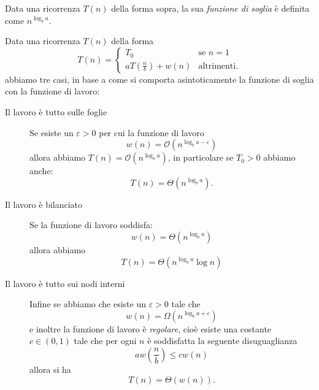\documentclass[11pt]{scrartcl}
\newcommand{\bigo}[1]{\mathcal{O}\!\left(#1\right)}
\newcommand{\bigomega}[1]{\Omega\!\left(#1\right)}
\newcommand{\bigtheta}[1]{\Theta\!\left(#1\right)}
\begin{document}
	\begin{definition}
		Data una ricorrenza $T(n)$ della forma sopra, la sua \textit{funzione di soglia} è definita come $n^{\log_b a}$.
	\end{definition}
	\begin{theorem}
		Data una ricorrenza $T(n)$ della forma
		$$T(n)=
		\begin{cases}
			T_0 & \text{se $n=1$} \\
			a T\left(\frac{n}{b}\right)+w(n) & \text{altrimenti.}
		\end{cases}
		$$
		abbiamo tre casi, in base a come si comporta asintoticamente la funzione di soglia con la funzione di lavoro:
		\begin{description}
			\item[Il lavoro è tutto sulle foglie] Se esiste un $\varepsilon>0$ per cui la funzione di lavoro
			$$w(n)=\bigo{n^{\log_b a -\varepsilon}}$$
			allora abbiamo $T(n)=\bigo{n^{\log_b a}}$, in particolare se $T_0>0$ abbiamo anche:
			$$\boxed{T(n)=\bigtheta{n^{\log_b a}}}.$$
			\item[Il lavoro è bilanciato] Se la funzione di lavoro soddisfa:
			$$w(n)=\bigtheta{n^{\log_b a}}$$
			allora abbiamo
			$$\boxed{T(n)=\bigtheta{n^{\log_b a}\log n}}$$
			\item[Il lavoro è tutto sui nodi interni] Infine se abbiamo che esiste un $\varepsilon>0$ tale che 
			$$w(n)=\bigomega{n^{\log_b a +\varepsilon}}$$
			e inoltre la funzione di lavoro è \textit{regolare}, cioè esiste una costante $c\in (0,1)$ tale che per ogni $n$ è soddisfatta la seguente disuguaglianza
			$$a w\left(\frac{n}{b}\right)\le c w(n)$$
			allora si ha
			$$\boxed{T(n)=\bigtheta{w(n)}}.$$
		\end{description}
	\end{theorem}
\end{document}

